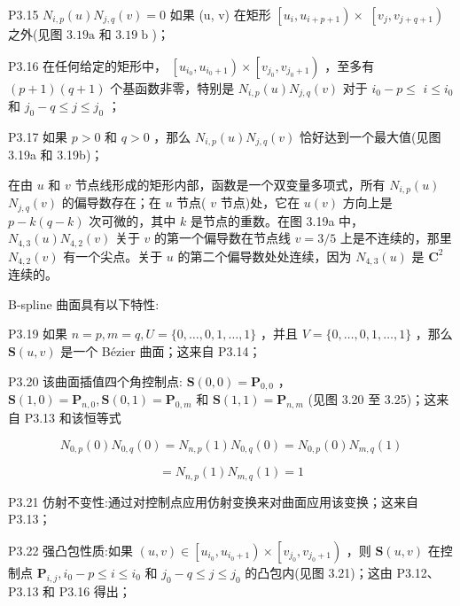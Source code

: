 \documentclass[../main.tex]{subfiles}
\begin{document}
P3.15 \({N}_{i,p}\left( u\right) {N}_{j,q}\left( v\right)  = 0\) 如果 (u, v) 在矩形 \(\left\lbrack  {{u}_{i},{u}_{i + p + 1}}\right)  \times\)  \(\left\lbrack  {{v}_{j},{v}_{j + q + 1}}\right)\) 之外(见图 \({3.19}\mathrm{a}\) 和 \({3.19}\mathrm{\;b}\) )；

P3.16 在任何给定的矩形中， \(\left\lbrack  {{u}_{{i}_{0}},{u}_{{i}_{0} + 1}}\right)  \times  \left\lbrack  {{v}_{{j}_{0}},{v}_{{j}_{0} + 1}}\right)\) ，至多有 \(\left( {p + 1}\right) \left( {q + 1}\right)\) 个基函数非零，特别是 \({N}_{i,p}\left( u\right) {N}_{j,q}\left( v\right)\) 对于 \({i}_{0} - p \leq\)  \(i \leq  {i}_{0}\) 和 \({j}_{0} - q \leq  j \leq  {j}_{0}\) ；

P3.17 如果 \(p > 0\) 和 \(q > 0\) ，那么 \({N}_{i,p}\left( u\right) {N}_{j,q}\left( v\right)\) 恰好达到一个最大值(见图 3.19a 和 3.19b)；

在由 \(u\) 和 \(v\) 节点线形成的矩形内部，函数是一个双变量多项式，所有 \({N}_{i,p}\left( u\right)\)  \({N}_{j,q}\left( v\right)\) 的偏导数存在；在 \(u\) 节点( \(v\) 节点)处，它在 \(u\left( v\right)\) 方向上是 \(p - k\left( {q - k}\right)\) 次可微的，其中 \(k\) 是节点的重数。在图 3.19a 中， \({N}_{4,3}\left( u\right) {N}_{4,2}\left( v\right)\) 关于 \(v\) 的第一个偏导数在节点线 \(v = 3/5\) 上是不连续的，那里 \({N}_{4,2}\left( v\right)\) 有一个尖点。关于 \(u\) 的第二个偏导数处处连续，因为 \({N}_{4,3}\left( u\right)\) 是 \({\mathbf{C}}^{2}\) 连续的。

B-spline 曲面具有以下特性:

P3.19 如果 \(n = p,m = q,U = \{ 0,\ldots ,0,1,\ldots ,1\}\) ，并且 \(V = \{ 0,\ldots ,0,1,\ldots ,1\}\) ，那么 \(\mathbf{S}\left( {u,v}\right)\) 是一个 Bézier 曲面；这来自 P3.14；

P3.20 该曲面插值四个角控制点: \(\mathbf{S}\left( {0,0}\right)  = {\mathbf{P}}_{0,0}\) ， \(\mathbf{S}\left( {1,0}\right)  = {\mathbf{P}}_{n,0},\mathbf{S}\left( {0,1}\right)  = {\mathbf{P}}_{0,m}\) 和 \(\mathbf{S}\left( {1,1}\right)  = {\mathbf{P}}_{n,m}\) (见图 3.20 至 3.25)；这来自 P3.13 和该恒等式

\[
{N}_{0,p}\left( 0\right) {N}_{0,q}\left( 0\right)  = {N}_{n,p}\left( 1\right) {N}_{0,q}\left( 0\right)  = {N}_{0,p}\left( 0\right) {N}_{m,q}\left( 1\right)
\]

\[
= {N}_{n,p}\left( 1\right) {N}_{m,q}\left( 1\right)  = 1
\]

P3.21 仿射不变性:通过对控制点应用仿射变换来对曲面应用该变换；这来自 P3.13；

P3.22 强凸包性质:如果 \(\left( {u,v}\right)  \in  \left\lbrack  {{u}_{{i}_{0}},{u}_{{i}_{0} + 1}}\right)  \times  \left\lbrack  {{v}_{{j}_{0}},{v}_{{j}_{0} + 1}}\right)\) ，则 \(\mathbf{S}\left( {u,v}\right)\) 在控制点 \({\mathbf{P}}_{i,j},{i}_{0} - p \leq  i \leq  {i}_{0}\) 和 \({j}_{0} - q \leq  j \leq  {j}_{0}\) 的凸包内(见图 3.21)；这由 P3.12、P3.13 和 P3.16 得出；
\end{document}

